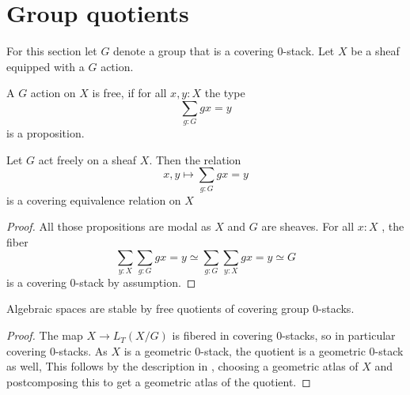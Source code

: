 \section{Group quotients}
For this section let $G$ denote a group that is a covering 0-stack. Let $X$ be a sheaf equipped with a $G$ action.
\begin{definition}
	A $G$ action on $X$ is free, if for all $x , y : X$ the type 
	\[
	\sum_{g: G} g x = y
	\]
	is a proposition. 
\end{definition}
\begin{lemma}
	Let $G$ act freely on a sheaf $X$. Then the relation
	\[
	x , y\mapsto \sum_{g : G} g x = y
	\]
	is a covering equivalence relation on $X$
\end{lemma}
\begin{proof}
	All those propositions are modal as $X$ and $G$ are sheaves. For all $x : X$ , the fiber
	\[
	\sum_{y : X} \sum_{g : G} g x = y \simeq \sum_{g : G} \sum_{y: X} g x = y \simeq G
	\]
	is a covering 0-stack by assumption.
\end{proof}
\begin{lemma}{\label{lemma:algSpacesStabFreeQuots}}
	Algebraic spaces are stable by free quotients of covering group 0-stacks.
\end{lemma}
\begin{proof}
	The map $ X \to L_T (X / G)$ is fibered in covering 0-stacks, so in particular covering $0$-stacks. As $X$ is a geometric $0$-stack, the quotient is a geometric $0$-stack as well, This follows by the description in \label{prop:nstack}, choosing a geometric atlas of $X$ and postcomposing this to get a geometric atlas of the quotient.
\end{proof}

%	
